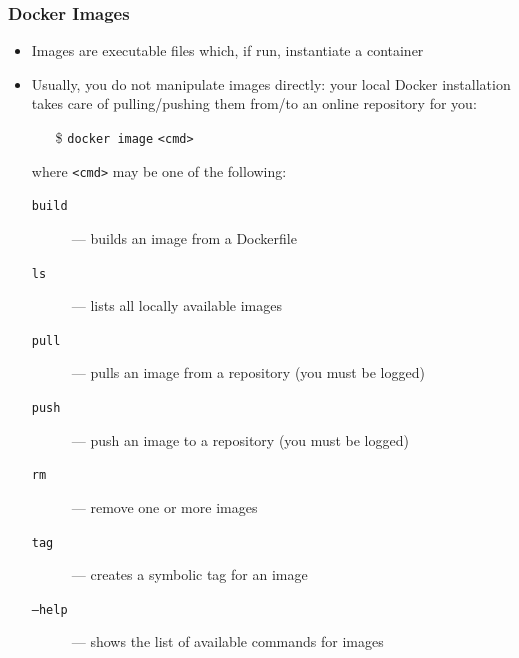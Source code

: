 \documentclass[presentation]{beamer}\mode<presentation>{\usetheme{AMSBolognaFC}}
\begin{document}
\begin{frame}
\frametitle[Docker Images]{Docker Images}

\begin{itemize}
	\item Images are executable files which, if run, instantiate a container
	\item Usually, you do not manipulate images directly: your local Docker installation takes care of pulling/pushing them from/to an online \alert{repository} for you:
	\begin{itemize}
		\item[\$] \texttt{docker image} \texttt{\alert{<cmd>}}
	\end{itemize}
	where \texttt{<cmd>} may be one of the following:
	\begin{description}
		\item[\texttt{build}] --- builds an image from a \alert{Dockerfile}
		\item[\texttt{ls}] --- lists all locally available images
		\item[\texttt{pull}] --- pulls an image from a \alert{repository} (you must be logged)
		\item[\texttt{push}] --- push an image to a \alert{repository} (you must be logged)
		\item[\texttt{rm}] --- remove one or more images
		\item[\texttt{tag}] --- creates a symbolic tag for an image
		\item[\texttt{--help}] --- shows the list of available commands for images

	\end{description}

\end{itemize}

\end{frame}
\end{document}

